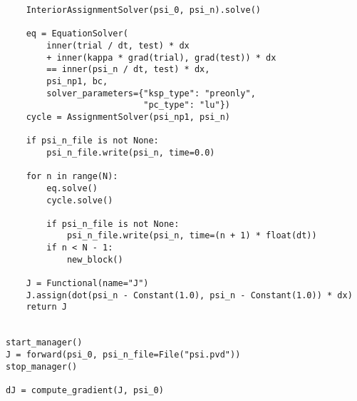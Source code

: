 \documentclass[11pt]{article}
\begin{document}
\begin{lstlisting}
    InteriorAssignmentSolver(psi_0, psi_n).solve()

    eq = EquationSolver(
        inner(trial / dt, test) * dx
        + inner(kappa * grad(trial), grad(test)) * dx
        == inner(psi_n / dt, test) * dx,
        psi_np1, bc,
        solver_parameters={"ksp_type": "preonly",
                           "pc_type": "lu"})
    cycle = AssignmentSolver(psi_np1, psi_n)

    if psi_n_file is not None:
        psi_n_file.write(psi_n, time=0.0)

    for n in range(N):
        eq.solve()
        cycle.solve()

        if psi_n_file is not None:
            psi_n_file.write(psi_n, time=(n + 1) * float(dt))
        if n < N - 1:
            new_block()

    J = Functional(name="J")
    J.assign(dot(psi_n - Constant(1.0), psi_n - Constant(1.0)) * dx)
    return J


start_manager()
J = forward(psi_0, psi_n_file=File("psi.pvd"))
stop_manager()

dJ = compute_gradient(J, psi_0)
\end{lstlisting}
\end{document}
